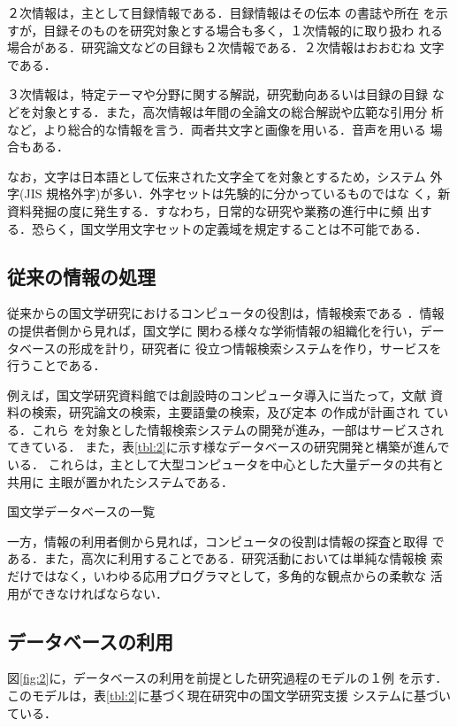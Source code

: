 ２次情報は，主として目録情報である．目録情報はその伝本
\setcounter{footnote}{0}\footnotemark の書誌や所在
を示すが，目録そのものを研究対象とする場合も多く，１次情報的に取り扱わ
れる場合がある．研究論文などの目録も２次情報である．２次情報はおおむね
文字である．

３次情報は，特定テーマや分野に関する解説，研究動向あるいは目録の目録
などを対象とする．また，高次情報は年間の全論文の総合解説や広範な引用分
析など，より総合的な情報を言う．両者共文字と画像を用いる．音声を用いる
場合もある．

なお，文字は日本語として伝来された文字全てを対象とするため，システム
外字(JIS 規格外字)が多い．外字セットは先験的に分かっているものではな
く，新資料発掘の度に発生する．すなわち，日常的な研究や業務の進行中に頻
出する．恐らく，国文学用文字セットの定義域を規定することは不可能である．

\subsection{従来の情報の処理}
従来からの国文学研究におけるコンピュータの役割は，情報検索である
\cite{Yasunaga1988,Yasunaga1989b}．情報の提供者側から見れば，国文学に
関わる様々な学術情報の組織化を行い，データベースの形成を計り，研究者に
役立つ情報検索システムを作り，サービスを行うことである．

例えば，国文学研究資料館では創設時のコンピュータ導入に当たって，文献
資料の検索，研究論文の検索，主要語彙の検索，及び定本
\setcounter{footnote}{0}\footnotemark の作成が計画され ている．これら
を対象とした情報検索システムの開発が進み，一部はサービスされてきている．
また，表\ref{tbl:2}に示す様なデータベースの研究開発と構築が進んでいる．
これらは，主として大型コンピュータを中心とした大量データの共有と共用に
主眼が置かれたシステムである\cite{Yasunaga1990,Yasunaga1991}．

\begin{table}[htb]
\begin{center}
  \caption{国文学データベースの一覧}\label{tbl:2}
  
\end{center}
\end{table}

一方，情報の利用者側から見れば，コンピュータの役割は情報の探査と取得
である．また，高次に利用することである．研究活動においては単純な情報検
索だけではなく，いわゆる応用プログラマとして，多角的な観点からの柔軟な
活用ができなければならない．

\subsection{データベースの利用}
図\ref{fig:2}に，データベースの利用を前提とした研究過程のモデルの１例
を示す．このモデルは，表\ref{tbl:2}に基づく現在研究中の国文学研究支援
システムに基づいている\cite{Hara1994,Hara1995}．

